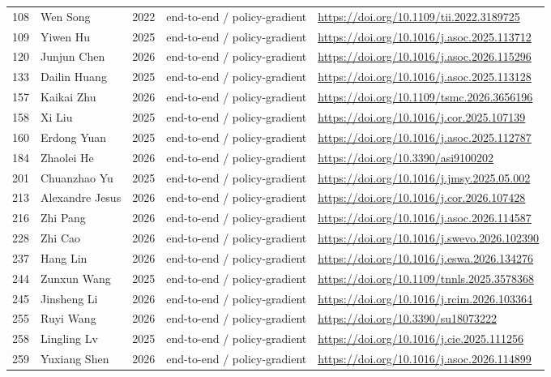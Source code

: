 \begin{longtable}{r p{3.0cm} r p{4.2cm} p{4.6cm}}
108 & Wen Song & 2022 & end-to-end / policy-gradient & \url{https://doi.org/10.1109/tii.2022.3189725} \\
109 & Yiwen Hu & 2025 & end-to-end / policy-gradient & \url{https://doi.org/10.1016/j.asoc.2025.113712} \\
120 & Junjun Chen & 2026 & end-to-end / policy-gradient & \url{https://doi.org/10.1016/j.asoc.2026.115296} \\
133 & Dailin Huang & 2025 & end-to-end / policy-gradient & \url{https://doi.org/10.1016/j.asoc.2025.113128} \\
157 & Kaikai Zhu & 2026 & end-to-end / policy-gradient & \url{https://doi.org/10.1109/tsmc.2026.3656196} \\
158 & Xi Liu & 2025 & end-to-end / policy-gradient & \url{https://doi.org/10.1016/j.cor.2025.107139} \\
160 & Erdong Yuan & 2025 & end-to-end / policy-gradient & \url{https://doi.org/10.1016/j.asoc.2025.112787} \\
184 & Zhaolei He & 2026 & end-to-end / policy-gradient & \url{https://doi.org/10.3390/asi9100202} \\
201 & Chuanzhao Yu & 2025 & end-to-end / policy-gradient & \url{https://doi.org/10.1016/j.jmsy.2025.05.002} \\
213 & Alexandre Jesus & 2026 & end-to-end / policy-gradient & \url{https://doi.org/10.1016/j.cor.2026.107428} \\
216 & Zhi Pang & 2026 & end-to-end / policy-gradient & \url{https://doi.org/10.1016/j.asoc.2026.114587} \\
228 & Zhi Cao & 2026 & end-to-end / policy-gradient & \url{https://doi.org/10.1016/j.swevo.2026.102390} \\
237 & Hang Lin & 2026 & end-to-end / policy-gradient & \url{https://doi.org/10.1016/j.eswa.2026.134276} \\
244 & Zunxun Wang & 2025 & end-to-end / policy-gradient & \url{https://doi.org/10.1109/tnnls.2025.3578368} \\
245 & Jinsheng Li & 2026 & end-to-end / policy-gradient & \url{https://doi.org/10.1016/j.rcim.2026.103364} \\
255 & Ruyi Wang & 2026 & end-to-end / policy-gradient & \url{https://doi.org/10.3390/su18073222} \\
258 & Lingling Lv & 2025 & end-to-end / policy-gradient & \url{https://doi.org/10.1016/j.cie.2025.111256} \\
259 & Yuxiang Shen & 2026 & end-to-end / policy-gradient & \url{https://doi.org/10.1016/j.asoc.2026.114899} \\

\end{longtable}
